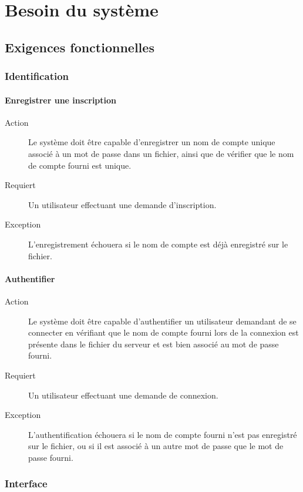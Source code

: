 \documentclass[a4paper]{article}
\begin{document}
\section{Besoin du système}
\subsection{Exigences fonctionnelles}

\subsubsection{Identification}
\paragraph{Enregistrer une inscription}
\begin{description}
\item[Action] Le système doit être capable d'enregistrer un nom de compte unique associé à un mot de passe dans un fichier, ainsi que de vérifier que le nom de compte fourni est unique.
\item[Requiert] Un \gls{utilisateur} effectuant une demande d'inscription.
\item[Exception] L'enregistrement échouera si le nom de compte est déjà enregistré sur le fichier.
\end{description}

\paragraph{Authentifier}
\begin{description}
\item[Action] Le système doit être capable d'authentifier un \gls{utilisateur} demandant de se connecter en vérifiant que le nom de compte fourni lors de la connexion est présente dans le fichier du \gls{serveur} et est bien associé au mot de passe fourni.
\item[Requiert] Un \gls{utilisateur} effectuant une demande de connexion.
\item[Exception] L'authentification échouera si le nom de compte fourni n'est pas enregistré sur le fichier, ou si il est associé à un autre mot de passe que le mot de passe fourni.
\end{description}

\subsubsection{Interface}
\end{document}
